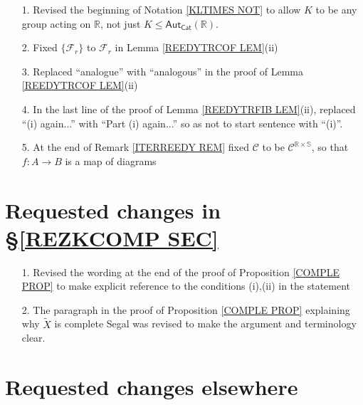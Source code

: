 \documentclass{article}
\begin{document}
\begin{itemize}
	
\item[1.] Revised the beginning of Notation \ref{KLTIMES NOT}
to allow $K$ to be any group acting on $\mathbb{R}$,
not just $K \leq \mathsf{Aut}_{\mathsf{Cat}}(\mathbb{R})$. 	

\item[2.] Fixed $\{\mathcal{F}_r\}$
to $\mathcal{F}_r$ in Lemma \ref{REEDYTRCOF LEM}(ii)
     
\item[3.] Replaced ``analogue'' with ``analogous'' in the proof of Lemma \ref{REEDYTRCOF LEM}(ii)

\item[4.]
In the last line of the proof of Lemma \ref{REEDYTRFIB LEM}(ii),
replaced ``(i) again...'' with ``Part (i) again...''
so as not to start sentence with ``(i)''.

\item[5.]
At the end of Remark \ref{ITERREEDY REM}
fixed $\mathcal{C}$
to be $\mathcal{C}^{\mathbb{R} \times \mathbb{S}}$,
so that $f\colon A \to B$ is a map of diagrams
\end{itemize}








\section{Requested changes in \S \ref{REZKCOMP SEC}}
 

\begin{itemize}
	\item[1.]
	Revised the wording at the end of the proof of 
	Proposition \ref{COMPLE PROP}
	to make explicit reference to the conditions (i),(ii)
	in the statement
	\item[2.]
	The paragraph in the proof of Proposition \ref{COMPLE PROP}
	explaining why $\widetilde{X}$
	is complete Segal was revised to make the argument and terminology clear.
\end{itemize}



\section{Requested changes elsewhere}
\end{document}
